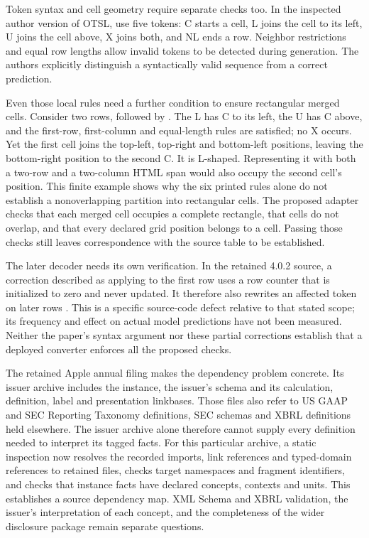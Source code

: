 Token syntax and cell geometry require separate checks too. In the inspected
author version of OTSL, \citet[Sections 4.1--4.3]{lysak2023otsl} use five
tokens: C starts a cell, L joins the cell to its left, U joins the cell above,
X joins both, and NL ends a row. Neighbor restrictions and equal row lengths
allow invalid tokens to be detected during generation. The authors explicitly
distinguish a syntactically valid sequence from a correct prediction.

Even those local rules need a further condition to ensure rectangular merged
cells. Consider two rows,  followed by . The L has
C to its left, the U has C above, and the first-row, first-column and
equal-length rules are satisfied; no X occurs. Yet the first cell joins the
top-left, top-right and bottom-left positions, leaving the bottom-right
position to the second C. It is L-shaped. Representing it with both a two-row
and a two-column HTML span would also occupy the second cell's position.
This finite example shows why the six printed rules alone do not establish a
nonoverlapping partition into rectangular cells. The proposed adapter checks
that each merged cell occupies a complete rectangle, that cells do not overlap,
and that every declared grid position belongs to a cell. Passing those checks
still leaves correspondence with the source table to be established.

The later decoder needs its own verification. In the retained 4.0.2 source,
a correction described as applying to the first row uses a row counter that
is initialized to zero and never updated. It therefore also rewrites an
affected token on later rows \citep{tableformerconsumer2026}. This is a
specific source-code defect relative to that stated scope; its frequency and
effect on actual model predictions have not been measured. Neither the paper's
syntax argument nor these partial corrections establish that a deployed
converter enforces all the proposed checks.


The retained Apple annual filing makes the dependency problem concrete. Its
issuer archive includes the instance, the issuer's schema and its calculation,
definition, label and presentation linkbases. Those files also refer to US GAAP
and SEC Reporting Taxonomy definitions, SEC schemas and XBRL definitions held
elsewhere. The issuer archive alone therefore cannot supply every definition
needed to interpret its tagged facts. For this particular archive, a static
inspection now resolves the recorded imports, link references and typed-domain
references to retained files, checks target namespaces and fragment identifiers,
and checks that instance facts have declared concepts, contexts and units.
This establishes a source dependency map. XML Schema and XBRL validation, the
issuer's interpretation of each concept, and the completeness of the wider
disclosure package remain separate questions.

